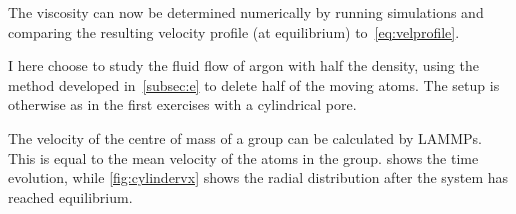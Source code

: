 \documentclass[11pt,british,a4paper]{report}
\begin{document}
The viscosity can now be determined numerically by running simulations and comparing the resulting velocity profile (at equilibrium) to~\vref{eq:velprofile}.

I here choose to study the fluid flow of argon with half the density, using the method developed in~\vref{subsec:e} to delete half of the moving atoms. The setup is otherwise as in the first exercises with a cylindrical pore.

The velocity of the centre of mass of a group can be calculated by LAMMPs. This is equal to the mean velocity of the atoms in the group.  shows the time evolution, while \vref{fig:cylindervx} shows the radial distribution after the system has reached equilibrium.

\end{document}
